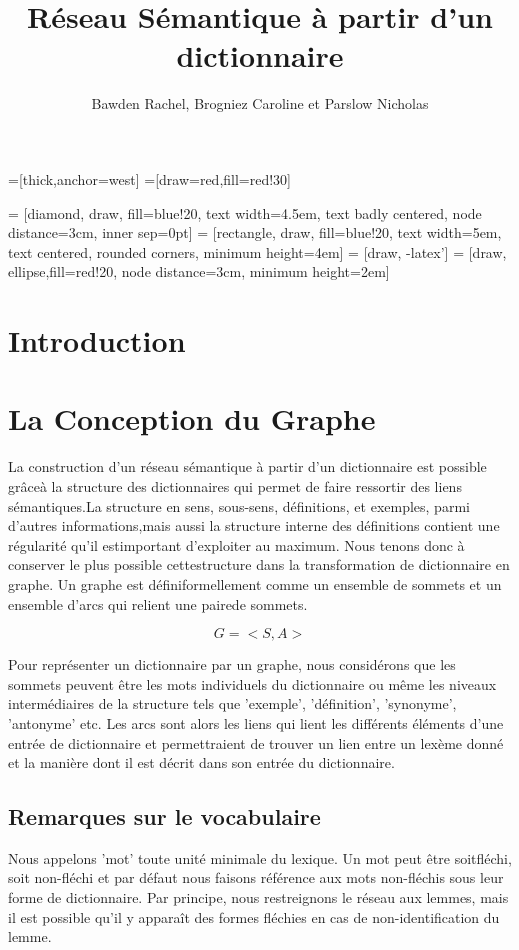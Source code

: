 \documentclass[a4paper, 12pt]{article}
\title{Réseau Sémantique à partir d'un dictionnaire}
\author{Bawden Rachel, Brogniez Caroline et Parslow Nicholas}
\date{}
\begin{document}
=[thick,anchor=west]
=[draw=red,fill=red!30]

 = [diamond, draw, fill=blue!20, 
    text width=4.5em, text badly centered, node distance=3cm, inner sep=0pt]
 = [rectangle, draw, fill=blue!20, 
    text width=5em, text centered, rounded corners, minimum height=4em]
 = [draw, -latex']
 = [draw, ellipse,fill=red!20, node distance=3cm,
    minimum height=2em]

\maketitle

\section{Introduction}


\section{La Conception du Graphe}

La construction d'un réseau sémantique à partir d'un dictionnaire est possible 
grâceà la structure des dictionnaires qui permet de faire ressortir des liens 
sémantiques.La structure en sens, sous-sens, définitions, et exemples, parmi 
d'autres informations,mais aussi la structure interne des définitions contient 
une régularité qu'il estimportant d'exploiter au maximum. Nous tenons donc à 
conserver le plus possible cettestructure dans la transformation de dictionnaire 
en graphe. Un graphe est définiformellement comme un ensemble de sommets et un 
ensemble d'arcs qui relient une pairede sommets.

\[
G = <S, A>
\]

Pour représenter un dictionnaire par un graphe, nous considérons que les 
sommets peuvent être les mots individuels du dictionnaire ou même les niveaux 
intermédiaires de la structure tels que 'exemple', 'définition', 'synonyme', 
'antonyme' etc. Les arcs sont alors les liens qui lient les différents éléments 
d'une entrée de dictionnaire et permettraient de trouver un lien entre un 
lexème donné et la manière dont il est décrit dans son entrée du dictionnaire.

\subsection{Remarques sur le vocabulaire}
Nous appelons 'mot' toute unité minimale du lexique. Un mot peut être
soitfléchi, soit non-fléchi et par défaut nous faisons référence aux mots 
non-fléchis sous leur forme de dictionnaire. Par principe, nous restreignons le 
réseau aux lemmes, mais il est possible qu'il y apparaît des formes fléchies en 
cas de non-identification du lemme.
\end{document}
